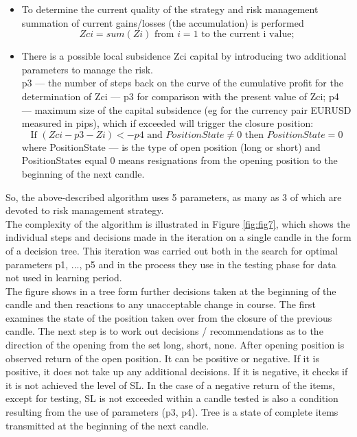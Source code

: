 \documentclass[runningheads,a4paper]{llncs}
\begin{document}
\begin{itemize}
\item To determine the current quality of the strategy and risk management summation of current gains/losses (the accumulation) is performed
\begin{equation}
Zci = sum ( Zi ) \text{ from } i = 1 \text{ to the current i value;}
\end{equation}
\item There is a possible local subsidence Zci capital by introducing two additional parameters to manage the risk.\\
p3 --- the number of steps back on the curve of the cumulative profit for the determination of Zci --- p3 for comparison with the present value of Zci;
p4 --- maximum size of the capital subsidence (eg for the currency pair EURUSD measured in pips), which if exceeded will trigger the closure position:\\
\begin{equation}
\text{If } ( Zci - p3 - Zi ) <- p4 \text{ and } PositionState \neq 0 \text{ then } PositionState = 0
\end{equation} 
where PositionState --- is the type of open position (long or short) and PositionStates equal 0 means resignations from the opening position to the beginning of the next candle.
\end{itemize}
So, the above-described algorithm uses 5 parameters, as many as 3 of which are devoted to risk management strategy.\\
The complexity of the algorithm is illustrated in Figure \ref{fig:fig7}, which shows the individual steps and decisions made in the iteration on a single candle in the form of a decision tree. This iteration was carried out both in the search for optimal parameters p1, ..., p5 and in the process they use in the testing phase for data not used in learning period.\\

The figure shows in a tree form further decisions taken at the beginning of the candle and then reactions to any unacceptable change in course. The first examines the state of the position taken over from the closure of the previous candle. The next step is to work out decisions / recommendations as to the direction of the opening from the set {long, short, none}. After opening position is observed return of the open position. It can be positive or negative. If it is positive, it does not take up any additional decisions. If it is negative, it checks if it is not achieved the level of SL. In the case of a negative return of the items, except for testing, SL is not exceeded within a candle tested is also a condition resulting from the use of parameters (p3, p4). Tree is a state of complete items transmitted at the beginning of the next candle.
\end{document}
